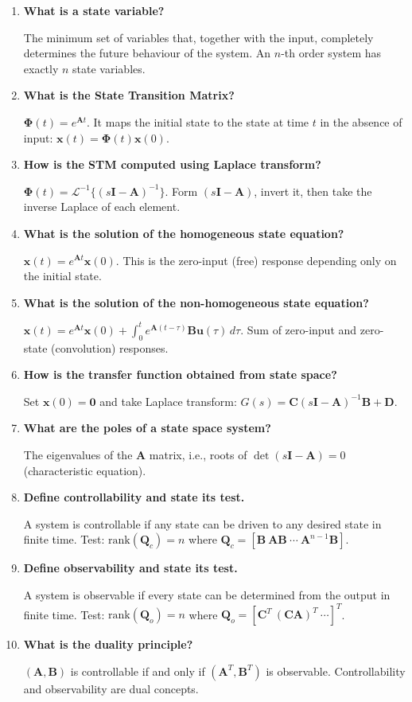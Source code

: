 \documentclass[12pt,a4paper]{article}
\newcommand{\Q}[1]{\textbf{#1}\par\noindent\ignorespaces}
\begin{document}
\begin{tcolorbox}[exambox, title={\textbf{Frequently Asked / Viva Questions}}]
\begin{enumerate}[topsep=0pt, label=\textbf{Q\arabic*.}, itemsep=5pt]
  \item \Q{What is a state variable?}
    The minimum set of variables that, together with the input, completely determines the future behaviour of the system. An $n$-th order system has exactly $n$ state variables.
  \item \Q{What is the State Transition Matrix?}
    $\boldsymbol{\Phi}(t) = e^{\mathbf{A}t}$. It maps the initial state to the state at time $t$ in the absence of input: $\mathbf{x}(t) = \boldsymbol{\Phi}(t)\mathbf{x}(0)$.
  \item \Q{How is the STM computed using Laplace transform?}
    $\boldsymbol{\Phi}(t) = \mathcal{L}^{-1}\{(s\mathbf{I}-\mathbf{A})^{-1}\}$. Form $(s\mathbf{I}-\mathbf{A})$, invert it, then take the inverse Laplace of each element.
  \item \Q{What is the solution of the homogeneous state equation?}
    $\mathbf{x}(t) = e^{\mathbf{A}t}\mathbf{x}(0)$. This is the zero-input (free) response depending only on the initial state.
  \item \Q{What is the solution of the non-homogeneous state equation?}
    $\mathbf{x}(t) = e^{\mathbf{A}t}\mathbf{x}(0) + \int_0^t e^{\mathbf{A}(t-\tau)}\mathbf{B}\mathbf{u}(\tau)\,d\tau$. Sum of zero-input and zero-state (convolution) responses.
  \item \Q{How is the transfer function obtained from state space?}
    Set $\mathbf{x}(0)=\mathbf{0}$ and take Laplace transform: $G(s) = \mathbf{C}(s\mathbf{I}-\mathbf{A})^{-1}\mathbf{B} + \mathbf{D}$.
  \item \Q{What are the poles of a state space system?}
    The eigenvalues of the $\mathbf{A}$ matrix, i.e., roots of $\det(s\mathbf{I}-\mathbf{A})=0$ (characteristic equation).
  \item \Q{Define controllability and state its test.}
    A system is controllable if any state can be driven to any desired state in finite time. Test: $\text{rank}(\mathbf{Q}_c) = n$ where $\mathbf{Q}_c = [\mathbf{B}\ \mathbf{A}\mathbf{B}\ \cdots\ \mathbf{A}^{n-1}\mathbf{B}]$.
  \item \Q{Define observability and state its test.}
    A system is observable if every state can be determined from the output in finite time. Test: $\text{rank}(\mathbf{Q}_o) = n$ where $\mathbf{Q}_o = [\mathbf{C}^T\ (\mathbf{C}\mathbf{A})^T\ \cdots]^T$.
  \item \Q{What is the duality principle?}
    $(\mathbf{A},\mathbf{B})$ is controllable if and only if $(\mathbf{A}^T,\mathbf{B}^T)$ is observable. Controllability and observability are dual concepts.


\end{enumerate}
\end{tcolorbox}
\end{document}
